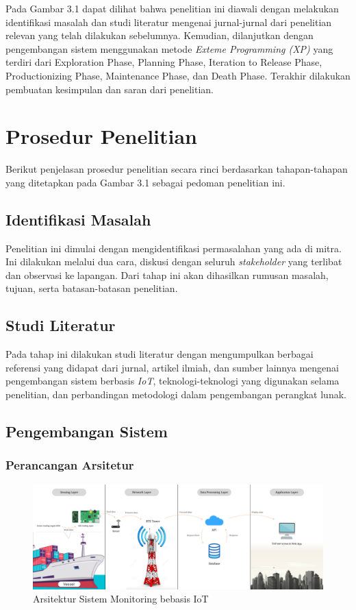 Pada Gambar 3.1 dapat dilihat bahwa penelitian ini diawali dengan melakukan identifikasi masalah dan studi literatur mengenai jurnal-jurnal dari penelitian relevan yang telah dilakukan sebelumnya. Kemudian, dilanjutkan dengan pengembangan sistem menggunakan metode \textit{Exteme Programming (XP)} yang terdiri dari Exploration Phase, Planning Phase, Iteration to Release Phase, Productionizing Phase, Maintenance Phase, dan Death Phase. Terakhir dilakukan pembuatan kesimpulan dan saran dari penelitian.

\section{Prosedur Penelitian}

Berikut penjelasan prosedur penelitian secara rinci berdasarkan tahapan-tahapan yang ditetapkan pada Gambar 3.1 sebagai pedoman penelitian ini.

\subsection{Identifikasi Masalah}

Penelitian ini dimulai dengan mengidentifikasi permasalahan yang ada di mitra. Ini dilakukan melalui dua cara, diskusi dengan seluruh \textit{stakeholder} yang terlibat dan observasi ke lapangan. Dari tahap ini akan dihasilkan rumusan masalah, tujuan, serta batasan-batasan penelitian.

\subsection{Studi Literatur}

Pada tahap ini dilakukan studi literatur dengan mengumpulkan berbagai referensi yang didapat dari jurnal, artikel ilmiah, dan sumber lainnya mengenai pengembangan sistem berbasis \textit{IoT}, teknologi-teknologi yang digunakan selama penelitian, dan perbandingan metodologi dalam pengembangan perangkat lunak.

\subsection{Pengembangan Sistem}

\subsubsection{Perancangan Arsitetur}

\begin{figure}[!h]
    \includegraphics[width=1\linewidth, center]{images/metode/fig-system-archi.png}
    \caption{Arsitektur Sistem Monitoring bebasis IoT}
    \label{fig:system-archi}
\end{figure}

